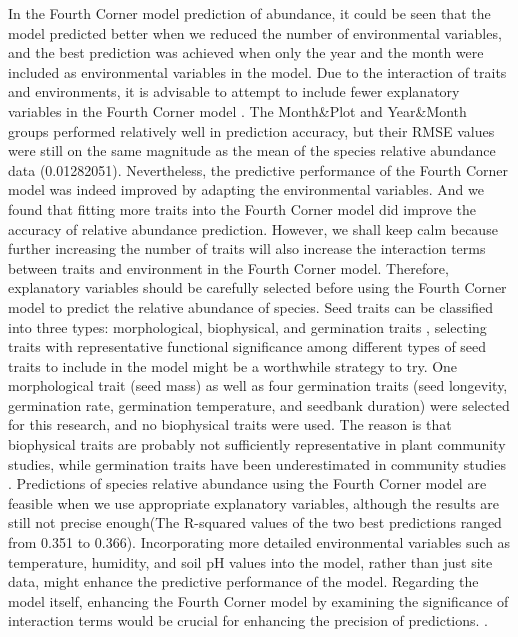 \documentclass[a4paper, 11, margin=2cm]{article}
\begin{document}
    In the Fourth Corner model prediction of abundance, it could be seen that the model predicted better when we reduced the number of environmental variables, and the best prediction was achieved when only the year and the month were included as environmental variables in the model. Due to the interaction of traits and environments, it is advisable to attempt to include fewer explanatory variables in the Fourth Corner model \citep{brown2014fourth}. The Month\&Plot and Year\&Month groups performed relatively well in prediction accuracy, but  their RMSE values were still on the same magnitude as the mean of the species relative abundance data (0.01282051). Nevertheless, the predictive performance of the Fourth Corner model was indeed improved by adapting the environmental variables. And we found that fitting more traits into the Fourth Corner model did improve the accuracy of relative abundance prediction. However, we shall keep calm because further increasing the number of traits will also increase the interaction terms between traits and environment in the Fourth Corner model. Therefore, explanatory variables should be carefully selected before using the Fourth Corner model to predict the relative abundance of species. Seed traits can be classified into three types: morphological, biophysical, and germination traits \citep{jimenez2016seed}, selecting traits with representative functional significance among different types of seed traits to include in the model might be a worthwhile strategy to try. One morphological trait (seed mass) as well as four germination traits (seed longevity, germination rate, germination temperature, and seedbank duration) were selected for this research, and no biophysical traits were used. The reason is that biophysical traits are probably not sufficiently representative in plant community studies, while germination traits have been underestimated in community studies \citep{jimenez2016seed}. Predictions of species relative abundance using the Fourth Corner model are feasible when we use appropriate explanatory variables, although the results are still not precise enough(The R-squared values of the two best predictions ranged from 0.351 to 0.366). Incorporating more detailed environmental variables such as temperature, humidity, and soil pH values into the model, rather than just site data, might enhance the predictive performance of the model. Regarding the model itself, enhancing the Fourth Corner model by examining the significance of interaction terms would be crucial for enhancing the precision of predictions. \citep{brown2014fourth}.
\end{document}
